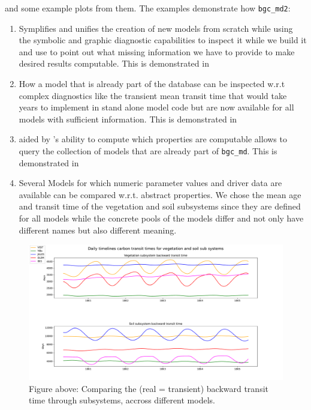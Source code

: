 and some example plots from them.
The examples demonstrate how \texttt{bgc_md2}:
\begin{enumerate}
\item 
  Symplifies and unifies the creation of new models from scratch while using the
  symbolic and graphic diagnostic capabilities to inspect it while we build it
  and use 
  \ComputabilityGraphs to point out what missing information we have to
  provide to make desired results computable.
  This is demonstrated in
\item 
  How a model that is already part of the database can be
  inspected w.r.t complex diagnostics like the transient mean transit time that
  would take years to implement in stand alone model code but are now available
  for all models with sufficient information.
  This is demonstrated in
\item 
  aided by \ComputabilityGraphs 's ability to compute which properties are computable
  allows to query the collection of models that are already part of
  \texttt{bgc\_md}.
  This is demonstrated in
\item 
  Several Models for which numeric parameter values and driver data are
  available can be compared w.r.t. abstract properties.
  We chose the mean age and transit time of the vegetation and soil subsystems
  since they are defined for all models while the concrete pools of the models
  differ and not only have different names but also different meaning.
\end{enumerate}

\begin{figure}[t]
	\includegraphics[width=\columnwidth]{test_veg_soil.pdf}
  \caption{
  Figure above: Comparing the (real = transient) backward transit time through 
  subsystems, accross different models. 
  }
\end{figure}  

